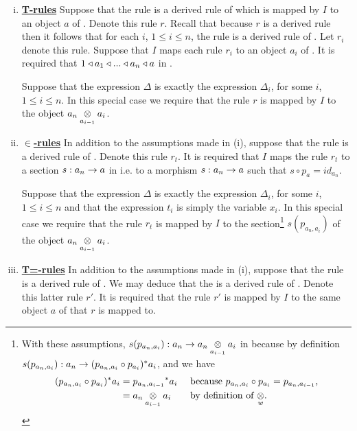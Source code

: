 \begin{enumerate}[(i)]
\setlength\itemindent{2cm}
\item \underline{\textbf{T-rules}} 
Suppose that  the rule
 is a derived rule of \gatUw which is mapped by $I$ to an object $a$ of \catc. Denote this rule $r$. Recall that because $r$ is a derived rule then it follows  that for each $i$, 
$1 \leq i \leq n$, the rule  is a derived rule of \gatU. Let $r_i$ denote this rule.
Suppose that $I$ maps each rule $r_i$ to an object $a_i$ of \catcw.
It is required that $1 \base a_1 \base ... \base a_n \base a$ in \catc.

Suppose that the  expression $\Delta$ is exactly the expression $\Delta_i$, for some $i$, $1 \leq i \leq n$. In this special case we require that the rule $r$  is mapped by $I$ to the object 
$\crossx{a_n}{a_i}{a_{i-1}}$. 

\item \underline{\textbf{$\boldsymbol {\in}$-rules}} 
In addition to the assumptions made in (i),  suppose that the rule
 is a  derived rule of \gatU. 
Denote this rule $r_t$. It is required that $I$ maps the rule $r_t$ to a section
 $s:a_n \morph a$ in \catcw i.e. to a morphism $s:a_n \morph a$ such that $s \circ p_a = id_{a_n}$. 

Suppose that the  expression $\Delta$ is exactly the expression $\Delta_i$, for some $i$, $1 \leq i \leq n$ and that the expression $t_i$ is simply the variable $x_i$. 
In this special case we require that the rule $r_t$  is mapped by $I$ to the section\footnote{
With these assumptions, $s(p_{a_n,a_i}): a_n \morph \crossx{a_n}{a_i}{a_{i-1}}$ in \catcw because by definition  $s(p_{a_n,a_i}): a_n  \morph (p_{a_n,a_i} \circ p_{a_i})^*a_i$,
and we have 
\begin{align*}
(p_{a_n,a_i} \circ p_{a_i})^*a_i &= {p_{a_n,a_{i-1}}} ^* a_i  && \mbox{ because $p_{a_n,a_i} \circ p_{a_i}=p_{a_n,a_{i-1}}$,} \\
                                 &= \crossx{a_n}{a_i}{a_{i-1}} && \mbox{ by definition of $\crossx{}{}{w}$}.
\end{align*}
} %
$s(p_{a_n,a_i})$ of the object $\crossx{a_n}{a_i}{a_{i-1}}$. 

\item \underline{\textbf{T=-rules}} 
In addition to the assumptions made in (i), suppose that  
the rule  is a derived rule of \gatU. 
We may deduce that the
 is a derived rule of \gatU. Denote this latter rule $r'$.
It is required that the rule $r'$ is mapped by $I$ to the same object $a$ of \catcw that $r$ is mapped to.


\end{enumerate}
